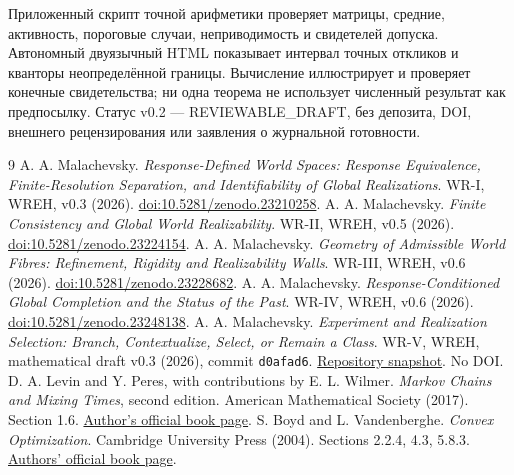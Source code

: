 {Приложенный скрипт точной арифметики проверяет матрицы, средние, активность, пороговые случаи, неприводимость и свидетелей допуска. Автономный двуязычный HTML показывает интервал точных откликов и кванторы неопределённой границы. Вычисление иллюстрирует и проверяет конечные свидетельства; ни одна теорема не использует численный результат как предпосылку. Статус v0.2 --- REVIEWABLE\_DRAFT, без депозита, DOI, внешнего рецензирования или заявления о журнальной готовности.}

\begingroup\raggedright
\begin{thebibliography}{9}
 A. A. Malachevsky. \emph{Response-Defined World Spaces: Response Equivalence, Finite-Resolution Separation, and Identifiability of Global Realizations}. WR-I, WREH, v0.3 (2026). \href{https://doi.org/10.5281/zenodo.23210258}{doi:10.5281/zenodo.23210258}.
 A. A. Malachevsky. \emph{Finite Consistency and Global World Realizability}. WR-II, WREH, v0.5 (2026). \href{https://doi.org/10.5281/zenodo.23224154}{doi:10.5281/zenodo.23224154}.
 A. A. Malachevsky. \emph{Geometry of Admissible World Fibres: Refinement, Rigidity and Realizability Walls}. WR-III, WREH, v0.6 (2026). \href{https://doi.org/10.5281/zenodo.23228682}{doi:10.5281/zenodo.23228682}.
 A. A. Malachevsky. \emph{Response-Conditioned Global Completion and the Status of the Past}. WR-IV, WREH, v0.6 (2026). \href{https://doi.org/10.5281/zenodo.23248138}{doi:10.5281/zenodo.23248138}.
 A. A. Malachevsky. \emph{Experiment and Realization Selection: Branch, Contextualize, Select, or Remain a Class}. WR-V, WREH, mathematical draft v0.3 (2026), commit \texttt{d0afad6}. \href{https://github.com/AIDevelopersMonster/WREH/tree/d0afad65108abee8b561e02af6fe3392c6057487/papers/WR-V/draft-v0.3}{Repository snapshot}. No DOI.
 D. A. Levin and Y. Peres, with contributions by E. L. Wilmer. \emph{Markov Chains and Mixing Times}, second edition. American Mathematical Society (2017). Section 1.6. \href{https://pages.uoregon.edu/dlevin/MARKOV/}{Author's official book page}.
 S. Boyd and L. Vandenberghe. \emph{Convex Optimization}. Cambridge University Press (2004). Sections 2.2.4, 4.3, 5.8.3. \href{https://web.stanford.edu/~boyd/cvxbook/}{Authors' official book page}.
\end{thebibliography}\endgroup
